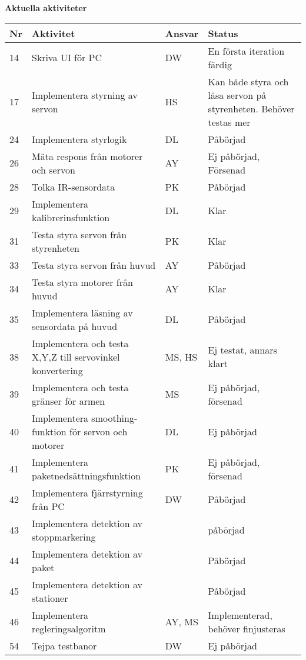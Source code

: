 \documentclass[titlepage, a4paper]{article}
\begin{document}
\newpage
\textbf{\Large Aktuella aktiviteter}
\begin{center}
\begin{tabularx}{\textwidth}{| p{4mm} | X | p{13.5mm} | X |}
	\hline
	\textbf{Nr} & \textbf{Aktivitet} & \textbf{Ansvar} & \textbf{Status} \\\hline
	{14} & {Skriva UI för PC} & {DW} & {En första iteration färdig} \\\hline
	{17} & {Implementera styrning av servon} & {HS} & {Kan både styra och läsa servon på styrenheten. Behöver testas mer} \\\hline
	{24} & {Implementera styrlogik} & {DL} & {Påbörjad} \\\hline
	{26} & {Mäta respons från motorer och servon} & {AY} & {Ej påbörjad, Försenad} \\\hline
	{28} & {Tolka IR-sensordata} & {PK} & {Påbörjad} \\\hline
	{29} & {Implementera kalibrerinsfunktion} & {DL} & {Klar} \\\hline
	{31} & {Testa styra servon från styrenheten} & {PK} & {Klar} \\\hline
	{33} & {Testa styra servon från huvud} & {AY} & {Påbörjad} \\\hline
	{34} & {Testa styra motorer från huvud} & {AY} & {Klar} \\\hline
	{35} & {Implementera läsning av sensordata på huvud} & {DL} & {Påbörjad} \\\hline
	{38} & {Implementera och testa X,Y,Z  till servovinkel konvertering} & {MS, HS} & {Ej testat, annars klart} \\\hline
	{39} & {Implementera och testa gränser för armen} & {MS} & {Ej påbörjad, försenad} \\\hline
	{40} & {Implementera smoothing-funktion för servon och motorer} & {DL} & {Ej påbörjad} \\\hline
	{41} & {Implementera paketnedsättningsfunktion} & {PK} & {Ej påbörjad, försenad} \\\hline
	{42} & {Implementera fjärrstyrning från PC} & {DW} & {Påbörjad} \\\hline
	{43} & {Implementera detektion av stoppmarkering} & {} & {påbörjad} \\\hline
	{44} & {Implementera detektion av paket} & {} & {Påbörjad} \\\hline
	{45} & {Implementera detektion av stationer} & {} & {Påbörjad} \\\hline
	{46} & {Implementera regleringsalgoritm} & {AY, MS} & {Implementerad, behöver finjusteras} \\\hline
	{54} & {Tejpa testbanor} & {DW} & {Ej påbörjad} \\\hline

\end{tabularx}
\end{center}
\end{document}
